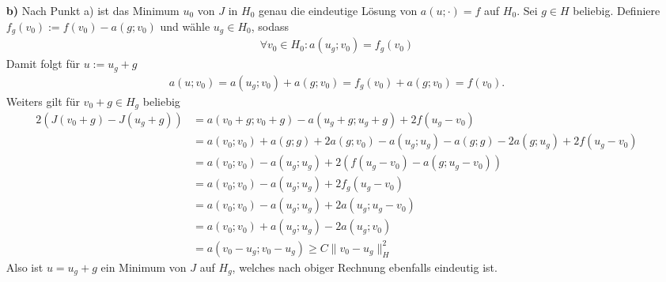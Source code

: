 \begin{solution}
\begin{itemize}
  \item[\textbf{b)}]
  Nach Punkt a) ist das Minimum $u_0$ von $J$ in $H_0$ genau die eindeutige Lösung von
  $a(u;\cdot) = f$ auf $H_0$. Sei $g \in H$ beliebig.
  Definiere $f_g(v_0) := f(v_0)  - a(g;v_0)$ und wähle $u_g \in H_0$, sodass
  \begin{align*}
    \forall v_0 \in H_0: a(u_g;v_0) = f_g(v_0)
  \end{align*}
  Damit folgt für $u := u_g + g$
  \begin{align*}
    a(u;v_0) = a(u_g;v_0) + a(g;v_0) = f_g(v_0) + a(g;v_0) = f(v_0).
  \end{align*}
  Weiters gilt für $v_0 + g \in H_g$ beliebig
  \begin{align*}
    2(J(v_0 + g) - J(u_g + g)) &= a(v_0 + g; v_0 + g) - a(u_g + g; u_g + g) + 2f(u_g - v_0) \\
    &= a(v_0 ; v_0) + a(g;g) + 2a(g; v_0) - a(u_g; u_g) - a(g;g) - 2a(g; u_g) + 2f(u_g - v_0) \\
    &= a(v_0 ; v_0)  - a(u_g; u_g) + 2(f(u_g - v_0) - a(g;u_g - v_0)) \\
    &= a(v_0 ; v_0)  - a(u_g; u_g) + 2f_g(u_g - v_0) \\
    &= a(v_0 ; v_0)  - a(u_g; u_g) + 2a(u_g;u_g - v_0) \\
    &= a(v_0 ; v_0)  + a(u_g; u_g) - 2a(u_g;v_0) \\
    &= a(v_0 - u_g; v_0 - u_g) \geq C\|v_0 - u_g\|_H^2
  \end{align*}
  Also ist $u = u_g + g$ ein Minimum von $J$ auf $H_g$, welches nach obiger Rechnung
  ebenfalls eindeutig ist.
\end{itemize}
\end{solution}

